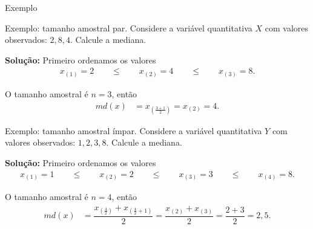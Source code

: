 \documentclass[8pt]{beamer}
\begin{document}
\begin{frame}{Exemplo}

{\small
  \begin{block}{Exemplo: tamanho amostral par.}
   Considere a variável quantitativa $X$ com valores observados: $2,8,4$. Calcule a mediana.
   
   \textbf{Solução:} Primeiro ordenamos os valores
   \begin{align*}
    x_{(1)} = 2 \qquad \leq \qquad x_{(2)}=4  \qquad \leq \qquad x_{(3)}=8.
   \end{align*}
  
  O tamanho amostral é $n=3$, então
  \begin{align*}
   md(x) &= x_{\left( \frac{3+1}{2} \right)} = x_{(2)} = 4.
  \end{align*}
  \end{block}
  
    \begin{block}{Exemplo: tamanho amostral ímpar.}
   Considere a variável quantitativa $Y$ com valores observados: $1,2,3,8$. Calcule a mediana.
   
   \textbf{Solução:} Primeiro ordenamos os valores
   \begin{align*}
    x_{(1)} = 1 \qquad \leq \qquad x_{(2)}=2  \qquad \leq \qquad x_{(3)}=3 \qquad \leq \qquad x_{(4)}=8.
   \end{align*}
  
  O tamanho amostral é $n=4$, então
  \begin{align*}
   md(x) &= \dfrac{ x_{\left( \frac{4}{2} \right)} + x_{\left( \frac{4}{2} +1\right)} }{2} = \dfrac{x_{(2)} + x_{(3)} }{2}=\dfrac{2+3}{2} = 2,5.
  \end{align*}
  \end{block}

}

\end{frame}
\end{document}
